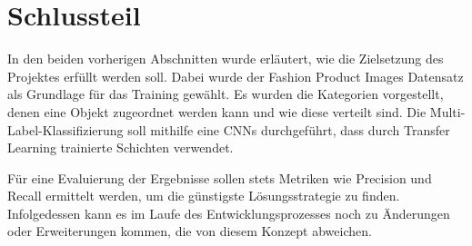 \section{Schlussteil} \label{sec:conclusion}

In den beiden vorherigen Abschnitten wurde erläutert, wie die Zielsetzung des Projektes erfüllt werden soll. Dabei wurde der Fashion Product Images Datensatz als Grundlage für das Training gewählt. Es wurden die Kategorien vorgestellt, denen eine Objekt zugeordnet werden kann und wie diese verteilt sind. Die Multi-Label-Klassifizierung soll mithilfe eine CNNs durchgeführt, dass durch Transfer Learning trainierte Schichten verwendet. 

Für eine Evaluierung der Ergebnisse sollen stets Metriken wie Precision und Recall ermittelt werden, um die günstigste Lösungsstrategie zu finden. Infolgedessen kann es im Laufe des Entwicklungsprozesses noch zu Änderungen oder Erweiterungen kommen, die von diesem Konzept abweichen.